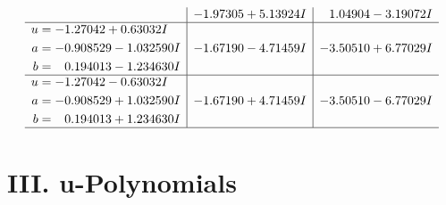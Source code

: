 \documentclass[1p]{elsarticle_modified}
\theoremstyle{definition}
\begin{document}
$$\begin{array}{c|c|c}
 & -1.97305 + 5.13924 I & \phantom{-}1.04904 - 3.19072 I \\ \hline\begin{aligned}
u &= -1.27042 + 0.63032 I \\
a &= -0.908529 - 1.032590 I \\
b &= \phantom{-}0.194013 - 1.234630 I\end{aligned}
 & -1.67190 - 4.71459 I & -3.50510 + 6.77029 I \\ \hline\begin{aligned}
u &= -1.27042 - 0.63032 I \\
a &= -0.908529 + 1.032590 I \\
b &= \phantom{-}0.194013 + 1.234630 I\end{aligned}
 & -1.67190 + 4.71459 I & -3.50510 - 6.77029 I\\
 \hline 
 \end{array}$$\newpage
\newpage\renewcommand{\arraystretch}{1}
\centering \section*{ III. u-Polynomials}
\end{document}
